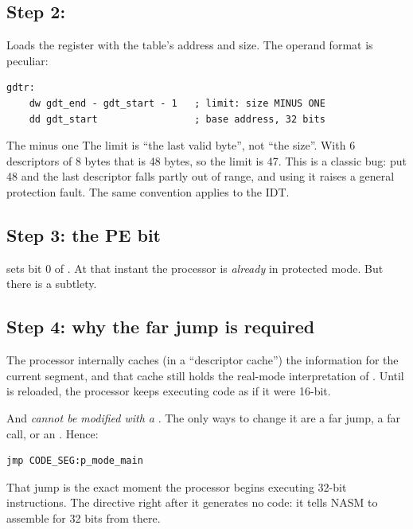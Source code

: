 \subsection{Step 2: }

Loads the  register with the table's address and size. The operand format is peculiar:

\begin{lstlisting}[style=asm]
gdtr:
    dw gdt_end - gdt_start - 1   ; limit: size MINUS ONE
    dd gdt_start                 ; base address, 32 bits
\end{lstlisting}

\begin{warn}{The minus one}
The limit is ``the last valid byte'', not ``the size''. With 6 descriptors of 8 bytes that is 48
bytes, so the limit is 47. This is a classic bug: put 48 and the last descriptor falls partly out of
range, and using it raises a general protection fault. The same convention applies to the IDT.
\end{warn}

\subsection{Step 3: the PE bit}

 sets bit 0 of . At that instant the processor is \emph{already} in
protected mode. But there is a subtlety.

\subsection{Step 4: why the far jump is required}

The processor internally caches (in a ``descriptor cache'') the information for the current
segment, and that cache still holds the real-mode interpretation of . Until  is
reloaded, the processor keeps executing code as if it were 16-bit.

And  \emph{cannot be modified with a }. The only ways to change it are a far jump,
a far call, or an . Hence:

\begin{lstlisting}[style=asm]
jmp CODE_SEG:p_mode_main
\end{lstlisting}

That jump is the exact moment the processor begins executing 32-bit instructions. The \cod{[bits
32]} directive right after it generates no code: it tells NASM to assemble for 32 bits from there.


